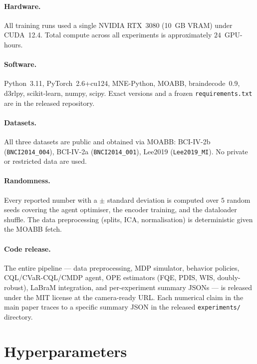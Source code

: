 \documentclass[conference]{IEEEtran}
\newcommand{\bcia}{BCI-IV-2a}
\newcommand{\bcib}{BCI-IV-2b}
\newcommand{\labram}{LaBraM}
\newcommand{\cql}{CQL}
\begin{document}
\paragraph{Hardware.}
All training runs used a single NVIDIA RTX~3080 (10~GB VRAM)
under CUDA~12.4. Total compute across all experiments is
approximately $24$~GPU-hours.

\paragraph{Software.}
Python~3.11, PyTorch~2.6+cu124, MNE-Python, MOABB,
braindecode~0.9, d3rlpy, scikit-learn, numpy, scipy. Exact
versions and a frozen \texttt{requirements.txt} are in the
released repository.

\paragraph{Datasets.}
All three datasets are public and obtained via MOABB:
\bcib{} (\texttt{BNCI2014\_004}), \bcia{}
(\texttt{BNCI2014\_001}), Lee2019 (\texttt{Lee2019\_MI}). No
private or restricted data are used.

\paragraph{Randomness.}
Every reported number with a $\pm$ standard deviation is computed
over $5$ random seeds covering the agent optimiser, the encoder
training, and the dataloader shuffle. The data preprocessing
(splits, ICA, normalisation) is deterministic given the MOABB
fetch.

\paragraph{Code release.}
The entire pipeline --- data preprocessing, MDP simulator,
behavior policies, \cql{}/CVaR-\cql{}/CMDP agent, OPE estimators
(FQE, PDIS, WIS, doubly-robust), \labram{} integration, and
per-experiment summary JSONs --- is released under the MIT
license at the camera-ready URL. Each numerical claim in the
main paper traces to a specific summary JSON in the released
\texttt{experiments/} directory.

\section{Hyperparameters}
\end{document}
